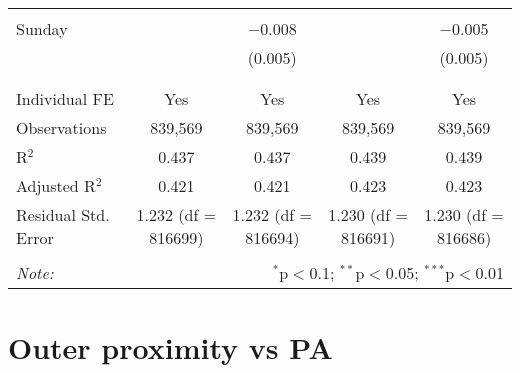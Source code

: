 \documentclass[
]{article}
\begin{document}
\begin{table}[!htbp]
{\begin{tabular}{@{\extracolsep{5pt}}lcccc}
  & & & & \\ 
 Sunday &  & $-$0.008 &  & $-$0.005 \\ 
  &  & (0.005) &  & (0.005) \\ 
  & & & & \\ 
\hline \\[-1.8ex] 
Individual FE & Yes & Yes & Yes & Yes \\ 
Observations & 839,569 & 839,569 & 839,569 & 839,569 \\ 
R$^{2}$ & 0.437 & 0.437 & 0.439 & 0.439 \\ 
Adjusted R$^{2}$ & 0.421 & 0.421 & 0.423 & 0.423 \\ 
Residual Std. Error & 1.232 (df = 816699) & 1.232 (df = 816694) & 1.230 (df = 816691) & 1.230 (df = 816686) \\ 
\hline 
\hline \\[-1.8ex] 
\textit{Note:}  & \multicolumn{4}{r}{$^{*}$p$<$0.1; $^{**}$p$<$0.05; $^{***}$p$<$0.01} \\ 
\end{tabular}
} 
\end{table} 
\newpage
\section{Outer proximity vs PA}
\end{document}
